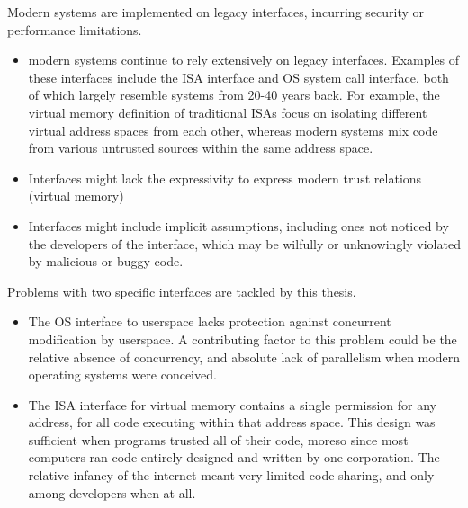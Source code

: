 Modern systems are implemented on legacy interfaces, incurring security or performance limitations.
\begin{itemize}
  \item modern systems continue to rely extensively on legacy interfaces. 
  Examples  of these interfaces include the ISA interface and OS system call interface, both of which largely resemble systems from 20-40 years back.
  For example, the virtual memory definition of traditional ISAs focus on isolating different virtual address spaces from each other, whereas modern systems mix code from various untrusted sources within the same address space.
  \item Interfaces might lack the expressivity to express modern trust relations (virtual memory)
  \item Interfaces might include implicit assumptions, including ones not noticed by the developers of the interface, which may be wilfully or unknowingly violated by malicious or buggy code.
\end{itemize}
Problems with two specific interfaces are tackled by this thesis.
\begin{itemize}
  \item The OS interface to userspace lacks protection against concurrent modification by userspace. 
        A contributing factor to this problem could be the relative absence of concurrency, and absolute 
        lack of parallelism when modern operating systems were conceived.
  \item The ISA interface for virtual memory contains a single permission for any address, for all code
        executing within that address space.
        This design was sufficient when programs trusted all of their code, moreso since most computers 
        ran code entirely designed and written by one corporation.
        The relative infancy of the internet meant very limited code sharing, and only among developers when
        at all.
\end{itemize}

